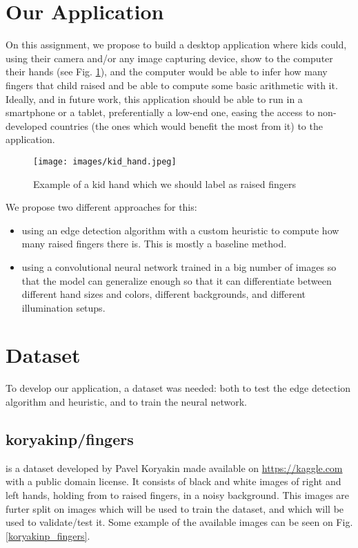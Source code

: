 \documentclass[conference]{IEEEtran}
\begin{document}
\section{Our Application}

On this assignment, we propose to build a desktop application where kids could, using their camera and/or any image capturing device, show to the computer their hands (see Fig. \ref{kid_hand}), and the computer would be able to infer how many fingers that child raised and be able to compute some basic arithmetic with it. Ideally, and in future work, this application should be able to run in a smartphone or a tablet, preferentially a low-end one, easing the access to non-developed countries (the ones which would benefit the most from it) to the application.

\begin{figure}[htbp]
\centerline{\texttt{[image: images/kid\_hand.jpeg]}}
\caption{Example of a kid hand which we should label as  raised fingers}
\label{kid_hand}
\end{figure}

We propose two different approaches for this:

\begin{itemize}
    \item using an edge detection algorithm with a custom heuristic to compute how many raised fingers there is. This is mostly a baseline method.
    \item using a convolutional neural network trained in a big number of images so that the model can generalize enough so that it can differentiate between different hand sizes and colors, different backgrounds, and different illumination setups.
\end{itemize}


\section {Dataset}

To develop our application, a dataset was needed: both to test the edge detection algorithm and heuristic, and to train the neural network.

\subsection{koryakinp/fingers}
\cite{b7} is a dataset developed by Pavel Koryakin made available on \href{Kaggle}{https://kaggle.com}  with a public domain license. It consists of  black and white  images of right and left hands, holding from  to  raised fingers, in a noisy background. This  images are  furter split on  images which will be used to train the dataset, and  which will be used to validate/test it. Some example of the available images can be seen on Fig. \ref{koryakinp_fingers}.
\end{document}
